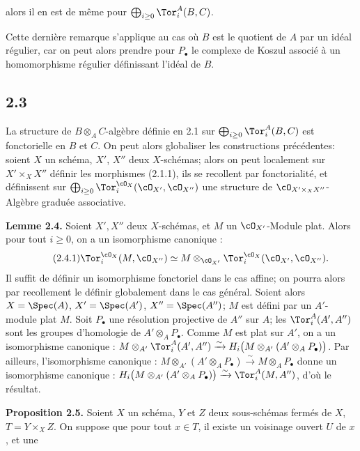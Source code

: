alors il en est de même pour \(\bigoplus_{i\ge0}\Tor_i^A(B,C)\).

Cette dernière remarque s'applique au cas où \(B\) est le quotient de \(A\) par un idéal régulier, car on peut alors prendre pour \(P_\bullet\) le complexe de Koszul associé à un homomorphisme régulier définissant l'idéal de \(B\).

\subsection*{2.3}
La structure de \(B\otimes_A C\)-algèbre définie en 2.1 sur \(\bigoplus_{i\ge0}\Tor_i^A(B,C)\) est fonctorielle en \(B\) et \(C\). On peut alors globaliser les constructions précédentes: soient \(X\) un schéma, \(X'\), \(X''\) deux \(X\)-schémas; alors on peut localement sur \(X'\times_X X''\) définir les morphismes (2.1.1), ils se recollent par fonctorialité, et définissent sur \(\bigoplus_{i\ge0}\Tor_i^{\cO_X}(\cO_{X'},\cO_{X''})\) une structure de \(\cO_{X'\times_X X''}\)-Algèbre graduée associative.

\textbf{Lemme 2.4.} Soient \(X',X''\) deux \(X\)-schémas, et \(M\) un \(\cO_{X'}\)-Module plat. Alors pour tout \(i\ge0\), on a un isomorphisme canonique :
\begin{equation}\tag{2.4.1}
\Tor_i^{\cO_X}(M,\cO_{X''})\simeq
M\otimes_{\cO_{X'}}\Tor_i^{\cO_X}(\cO_{X'},\cO_{X''}).
\end{equation}
Il suffit de définir un isomorphisme fonctoriel dans le cas affine; on pourra alors par recollement le définir globalement dans le cas général. Soient alors \(X=\Spec(A)\), \(X'=\Spec(A')\), \(X''=\Spec(A'')\); \(M\) est défini par un \(A'\)-module plat \(M\). Soit \(P_\bullet\) une résolution projective de \(A''\) sur \(A\); les \(\Tor_i^A(A',A'')\) sont les groupes d'homologie de \(A'\otimes_A P_\bullet\). Comme \(M\) est plat sur \(A'\), on a un isomorphisme canonique : \(M\otimes_{A'}\Tor_i^A(A',A'')\xrightarrow{\sim}H_i\bigl(M\otimes_{A'}(A'\otimes_A P_\bullet)\bigr)\). Par ailleurs, l'isomorphisme canonique : \(M\otimes_{A'}(A'\otimes_A P_\bullet)\xrightarrow{\sim}M\otimes_A P_\bullet\) donne un isomorphisme canonique : \(H_i\bigl(M\otimes_{A'}(A'\otimes_A P_\bullet)\bigr)\xrightarrow{\sim}\Tor_i^A(M,A'')\), d'où le résultat.

\textbf{Proposition 2.5.} Soient \(X\) un schéma, \(Y\) et \(Z\) deux sous-schémas fermés de \(X\), \(T=Y\times_X Z\). On suppose que pour tout \(x\in T\), il existe un voisinage ouvert \(U\) de \(x\), et une
